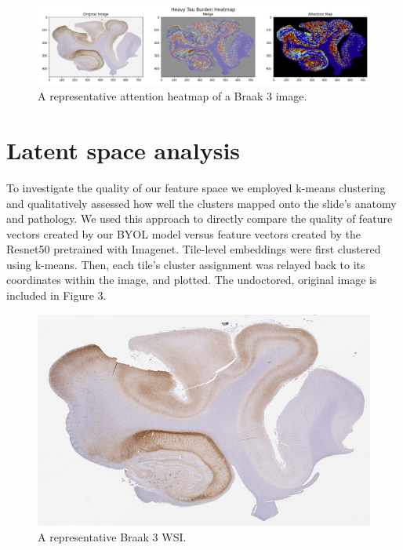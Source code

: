 \documentclass{article} %
\begin{document}
\begin{figure}[h]
\begin{center}
\includegraphics[scale=0.25]{attention_maps.png}
\end{center}
\caption{A representative attention heatmap of a Braak 3 image.}
\end{figure}

\section{Latent space analysis}
\label{lsa}

To investigate the quality of our feature space we employed k-means clustering and qualitatively assessed how well the clusters mapped onto the slide’s anatomy and pathology. We used this approach to directly compare the quality of feature vectors created by our BYOL model versus feature vectors created by the Resnet50 pretrained with Imagenet. Tile-level embeddings were first clustered using k-means. Then, each tile's cluster assignment was relayed back to its coordinates within the image, and plotted. The undoctored, original image is included in Figure 3.

\begin{figure}[h]
\begin{center}
\includegraphics[scale=0.25]{wsi_undoctored.png}
\end{center}
\caption{A representative Braak 3 WSI.}
\end{figure}
\end{document}

